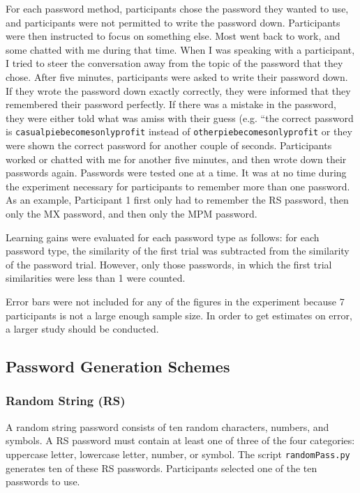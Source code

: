 \documentclass{article}
\begin{document}
For each password method, participants chose the password they wanted to use, and participants were not permitted to write the password down. Participants were then instructed to focus on something else. Most went back to work, and some chatted with me during that time. When I was speaking with a participant, I tried to steer the conversation away from the topic of the password that they chose. After five minutes, participants were asked to write their password down. If they wrote the password down exactly correctly, they were informed that they remembered their password perfectly. If there was a mistake in the password, they were either told what was amiss with their guess (e.g. ``the correct password is \texttt{casualpiebecomesonlyprofit} instead of \texttt{otherpiebecomesonlyprofit} or they were shown the correct password for another couple of seconds. Participants worked or chatted with me for another five minutes, and then wrote down their passwords again. Passwords were tested one at a time. It was at no time during the experiment necessary for participants to remember more than one password. As an example, Participant 1 first only had to remember the RS password, then only the MX password, and then only the MPM password.

Learning gains were evaluated for each password type as follows: for each password type, the similarity of the first trial was subtracted from the similarity of the password trial. However, only those passwords, in which the first trial similarities were less than 1 were counted. 

Error bars were not included for any of the figures in the experiment because 7 participants is not a large enough sample size. In order to get estimates on error, a larger study should be conducted.



\subsection*{Password Generation Schemes}
\subsubsection*{Random String (RS)}
A random string password consists of ten random characters, numbers, and symbols. A RS password must contain at least one of three of the four categories: uppercase letter, lowercase letter, number, or symbol. The script \texttt{randomPass.py} generates ten of these RS passwords. Participants selected one of the ten passwords to use.
\end{document}

